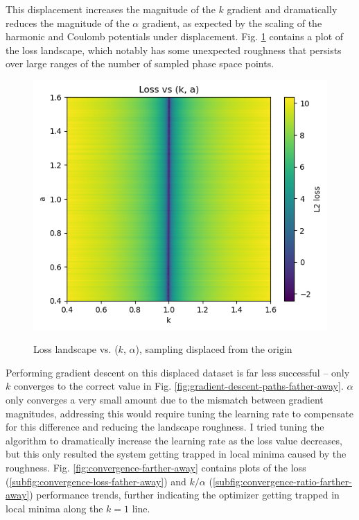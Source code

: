 \documentclass[]{article}
\begin{document}
This displacement increases the magnitude of the $k$ gradient and dramatically reduces the magnitude of the $\alpha$ gradient, as expected by the scaling of the harmonic and Coulomb potentials under displacement. Fig. \ref{fig:loss-landscape-father-away} contains a plot of the loss landscape, which notably has some unexpected roughness that persists over large ranges of the number of sampled phase space points.

\begin{figure}[H]
	\caption{Loss landscape vs. ($k$, $\alpha$), sampling displaced from the origin}
	\centering
	\includegraphics[scale=0.70]{loss-landscape-farther-away.png}
	\label{fig:loss-landscape-father-away}
\end{figure}

Performing gradient descent on this displaced dataset is far less successful -- only $k$ converges to the correct value in Fig. \ref{fig:gradient-descent-paths-father-away}. $\alpha$ only converges a very small amount due to the mismatch between gradient magnitudes, addressing this would require tuning the learning rate to compensate for this difference and reducing the landscape roughness. I tried tuning the algorithm to dramatically increase the learning rate as the loss value decreases, but this only resulted the system getting trapped in local minima caused by the roughness. Fig. \ref{fig:convergence-farther-away} contains plots of the loss (\ref{subfig:convergence-loss-father-away}) and $k/\alpha$ (\ref{subfig:convergence-ratio-farther-away}) performance trends, further indicating the optimizer getting trapped in local minima along the $k=1$ line.
\end{document}
